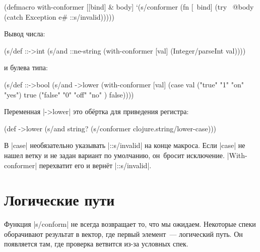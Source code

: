 \begin{english}
  \begin{clojure}
(defmacro with-conformer
  [[bind] & body]
  `(s/conformer
    (fn [~bind]
      (try
        ~@body
        (catch Exception e#
          ::s/invalid)))))
  \end{clojure}
\end{english}

\noindent
Вывод числа:

\begin{english}
  \begin{clojure}
(s/def ::->int
  (s/and
   ::ne-string
   (with-conformer [val]
     (Integer/parseInt val))))
  \end{clojure}
\end{english}

\noindent
и булева типа:

\begin{english}
  \begin{clojure}
(s/def ::->bool
  (s/and
   ->lower
   (with-conformer [val]
     (case val
       ("true"  "1" "on"  "yes") true
       ("false" "0" "off" "no" ) false))))
  \end{clojure}
\end{english}


\noindent
Переменная \spverb|->lower| это об\"{е}ртка для приведения регистра:

\begin{english}
  \begin{clojure}
(def ->lower
  (s/and
    string?
    (s/conformer clojure.string/lower-case)))
  \end{clojure}
\end{english}

В \spverb|case| необязательно указывать \spverb|::s/invalid| на конце
макроса. Если \spverb|case| не нашел ветку и не задан вариант по умолчанию,
он~бросит исключение. \spverb|With-conformer| перехватит его и верн\"{е}т
\spverb|::s/invalid|.

\section{Логические пути}


Функция \spverb|s/conform| не всегда возвращает то, что мы ожидаем. Некоторые
спеки оборачивают результат в вектор, где первый элемент~--- логический путь. Он
появляется там, где проверка ветвится из-за условных спек.

